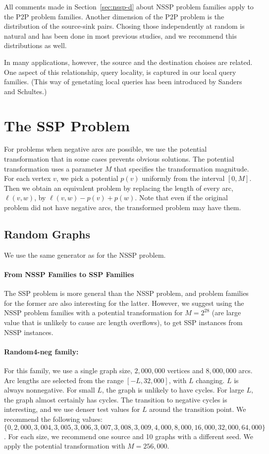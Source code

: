 \documentclass[11pt]{article}
\begin{document}
All comments made in Section~\ref{sec:nssp-d} about
NSSP problem families apply to the P2P problem families.
Another dimension of the P2P problem is the distribution of the
source-sink pairs.
Chosing those independently at random is natural and has been done
in most previous studies, and we recommend this distributions as well.

In many applications, however, the source and the destination choises
are related.
One aspect of this relationship, query locality, is captured in
our local query families.
(This way of genetating local queries has been introduced
by Sanders and Schultes.)


\section{The SSP Problem}

For problems when negative arcs are possible, we use the potential
transformation that in some cases prevents obvious solutions.
The potential transformation uses a parameter $M$ that specifies
the transformation magnitude.
For each vertex $v$, we pick a potential $p(v)$ uniformly from
the interval $[0, M]$.
Then we obtain an equivalent problem by replacing the length of
every arc, $\ell(v,w)$, by $\ell(v,w) - p(v) + p(w)$.
Note that even if the original problem did not have negative arcs,
the transformed problem may have them.

\subsection{Random Graphs}

We use the same generator as for the NSSP problem.

\paragraph{From NSSP Families to SSP Families}
The SSP problem is more general than the NSSP problem, and problem
families for the former are also interesting for the latter.
However, we suggest using the NSSP problem families with a potential
transformation for $M = 2^{28}$ (are large value that
is unlikely to cause arc length overflows), to get SSP
instances from NSSP instances.

\paragraph{Random4-neg family:}
For this family, we use a single graph size, $2,000,000$ vertices
and $8,000,000$ arcs.
Arc lengths are selected from the range $[-L, 32,000]$, with $L$
changing. $L$ is always nonnegative.
For small $L$, the graph is unlikely to have cycles.
For large $L$, the graph almost certainly has cycles.
The transition to negative cycles is interesting, and we use
denser test values for $L$ around the transition point.
We recommend the following values:
$\{0, 2,000, 3,004, 3,005, 3,006, 3,007, 3,008, 3,009, 4,000, 8,000,16,000,32,000, 64,000\}$.
For each size, we recommend one source and 10 graphs with a different seed.
We apply the potential transformation with $M = 256,000$.
\end{document}
